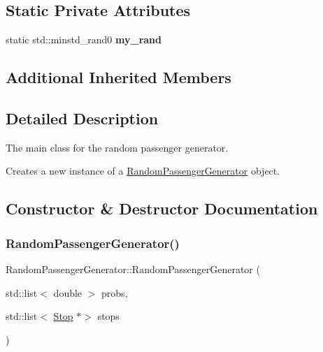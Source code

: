 \subsection*{Static Private Attributes}
\begin{DoxyCompactItemize}
\item 
\mbox{\label{classRandomPassengerGenerator_af695eeece3acf5f2e2a7f25f9c46bfbe}} 
static std\+::minstd\+\_\+rand0 {\bfseries my\+\_\+rand}
\end{DoxyCompactItemize}
\subsection*{Additional Inherited Members}


\subsection{Detailed Description}
The main class for the random passenger generator. 

Creates a new instance of a \hyperlink{classRandomPassengerGenerator}{Random\+Passenger\+Generator} object. 

\subsection{Constructor \& Destructor Documentation}
\mbox{\label{classRandomPassengerGenerator_a1be1b4abfe82bfe95eb0a078d9a3342d}} 
\subsubsection{\texorpdfstring{Random\+Passenger\+Generator()}{RandomPassengerGenerator()}}
{\footnotesize\ttfamily Random\+Passenger\+Generator\+::\+Random\+Passenger\+Generator (\begin{DoxyParamCaption}\item[{std\+::list$<$ double $>$}]{probs,  }\item[{std\+::list$<$ \hyperlink{classStop}{Stop} $\ast$$>$}]{stops }\end{DoxyParamCaption})}



